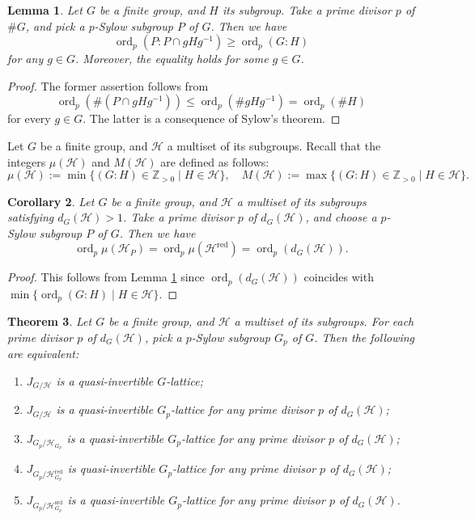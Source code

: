 \documentclass[12pt]{amsart}
\theoremstyle{plain}
\newtheorem{thm}{Theorem}[section]
\newtheorem{cor}[thm]{Corollary}
\newtheorem{lem}[thm]{Lemma}
\theoremstyle{definition}
\numberwithin{thm}{section}
\numberwithin{equation}{section}
\newcommand{\Zpn}{\mathbb{Z}_{>0}}
\newcommand{\cH}{\mathcal{H}}
\DeclareMathOperator{\ord}{ord}
\DeclareMathOperator{\red}{red}
\DeclareMathOperator{\srd}{srd}
\begin{document}
\begin{lem}\label{lem:psyl}
Let $G$ be a finite group, and $H$ its subgroup. Take a prime divisor $p$ of $\#G$, and pick a $p$-Sylow subgroup $P$ of $G$. Then we have
    \begin{equation*}
        \ord_{p}(P:P\cap gHg^{-1})\geq \ord_{p}(G:H)
    \end{equation*}
    for any $g\in G$. Moreover, the equality holds for some $g\in G$. 
\end{lem}

\begin{proof}
The former assertion follows from
\begin{equation*}
    \ord_{p}(\#(P\cap gHg^{-1}))\leq \ord_{p}(\#gHg^{-1})=\ord_{p}(\#H)
\end{equation*}
for every $g\in G$. The latter is a consequence of Sylow's theorem. 
\end{proof}

Let $G$ be a finite group, and $\cH$ a multiset of its subgroups. Recall \cite[Definition 5.3]{Hasegawa} that the integers $\mu(\cH)$ and $M(\cH)$ are defined as follows: 
\begin{equation*}
\mu(\cH):=\min\{(G:H)\in \Zpn \mid H\in \cH\},\quad M(\cH):=\max \{(G:H)\in \Zpn \mid H\in \cH\}. 
\end{equation*}

\begin{cor}\label{cor:hppo}
Let $G$ be a finite group, and $\cH$ a multiset of its subgroups satisfying $d_G(\cH)>1$.
Take a prime divisor $p$ of $d_G(\cH)$, and choose a $p$-Sylow subgroup $P$ of $G$. Then we have
\begin{equation*}
\ord_{p}\mu(\cH_{P})=\ord_{p}\mu(\cH^{\red})=\ord_{p}(d_G(\cH)). 
\end{equation*}
\end{cor}

\begin{proof}
This follows from Lemma \ref{lem:psyl} since $\ord_{p}(d_{G}(\cH))$ coincides with $\min\{\ord_{p}(G:H)\mid H\in \cH\}$. 
\end{proof}

\begin{thm}\label{thm:qips}
Let $G$ be a finite group, and $\cH$ a multiset of its subgroups. For each prime divisor $p$ of $d_{G}(\cH)$, pick a $p$-Sylow subgroup $G_{p}$ of $G$. Then the following are equivalent: 
\begin{enumerate}
\item $J_{G/\cH}$ is a quasi-invertible $G$-lattice; 
\item $J_{G/\cH}$ is a quasi-invertible $G_{p}$-lattice for any prime divisor $p$ of $d_{G}(\cH)$; 
\item $J_{G_{p}/\cH_{G_{p}}}$ is a quasi-invertible $G_{p}$-lattice for any prime divisor $p$ of $d_{G}(\cH)$; 
\item $J_{G_{p}/\cH_{G_{p}}^{\red}}$ is quasi-invertible $G_{p}$-lattice for any prime divisor $p$ of $d_{G}(\cH)$; 
\item $J_{G_{p}/\cH_{G_{p}}^{\srd}}$ is a quasi-invertible $G_{p}$-lattice for any prime divisor $p$ of $d_{G}(\cH)$. 
\end{enumerate}
\end{thm}
\end{document}
